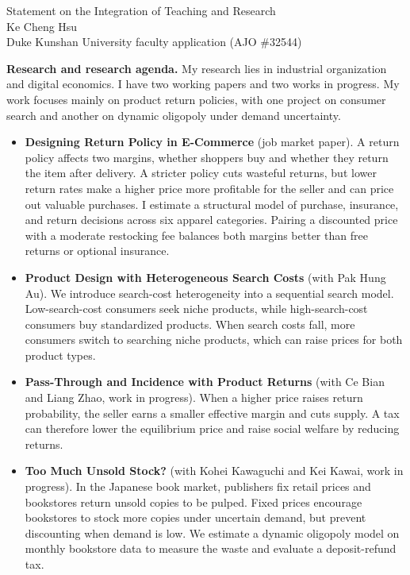 \documentclass[11pt]{article}
\begin{document}
\begin{center}
{\Large Statement on the Integration of Teaching and Research}\\[0.25em]
Ke Cheng Hsu \\[0.15em]
{\small Duke Kunshan University faculty application (AJO \#32544)}
\end{center}

\noindent\textbf{Research and research agenda.} My research lies in industrial organization and digital economics. I have two working papers and two works in progress. My work focuses mainly on product return policies, with one project on consumer search and another on dynamic oligopoly under demand uncertainty.

\begin{itemize}[leftmargin=1.6em,itemsep=0em,topsep=0.05em,parsep=0em]
\item \textbf{Designing Return Policy in E-Commerce} (job market paper). A return policy affects two margins, whether shoppers buy and whether they return the item after delivery. A stricter policy cuts wasteful returns, but lower return rates make a higher price more profitable for the seller and can price out valuable purchases. I estimate a structural model of purchase, insurance, and return decisions across six apparel categories. Pairing a discounted price with a moderate restocking fee balances both margins better than free returns or optional insurance.
\item \textbf{Product Design with Heterogeneous Search Costs} (with Pak Hung Au). We introduce search-cost heterogeneity into a sequential search model. Low-search-cost consumers seek niche products, while high-search-cost consumers buy standardized products. When search costs fall, more consumers switch to searching niche products, which can raise prices for both product types.
\item \textbf{Pass-Through and Incidence with Product Returns} (with Ce Bian and Liang Zhao, work in progress). When a higher price raises return probability, the seller earns a smaller effective margin and cuts supply. A tax can therefore lower the equilibrium price and raise social welfare by reducing returns.
\item \textbf{Too Much Unsold Stock?} (with Kohei Kawaguchi and Kei Kawai, work in progress). In the Japanese book market, publishers fix retail prices and bookstores return unsold copies to be pulped. Fixed prices encourage bookstores to stock more copies under uncertain demand, but prevent discounting when demand is low. We estimate a dynamic oligopoly model on monthly bookstore data to measure the waste and evaluate a deposit-refund tax.
\end{itemize}
\end{document}
